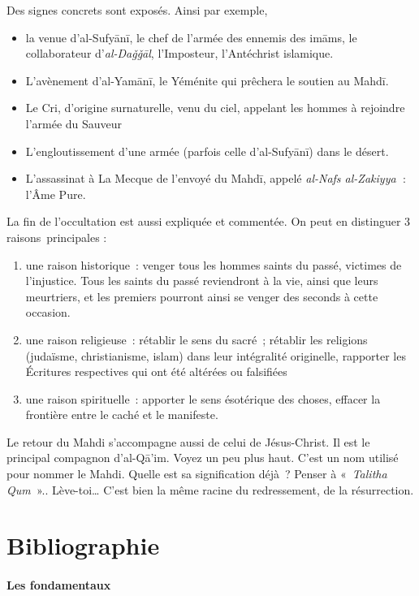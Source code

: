 Des signes concrets sont exposés. Ainsi par exemple,

\begin{itemize}
\item
  la venue d'al-Sufyānī, le chef de l'armée des ennemis des imāms, le
  collaborateur d'\emph{al-Daǧǧāl}, l'Imposteur, l'Antéchrist islamique.
\item
  L'avènement d'al-Yamānī, le Yéménite qui prêchera le soutien au Mahdī.
\item
  Le Cri, d'origine surnaturelle, venu du ciel, appelant les hommes à
  rejoindre l'armée du Sauveur
\item
  L'engloutissement d'une armée (parfois celle d'al-Sufyānī) dans le
  désert.
\item
  L'assassinat à La Mecque de l'envoyé du Mahdī, appelé \emph{al-Nafs
  al-Zakiyya\textbf{~}}: l'Âme Pure.
\end{itemize}

La fin de l'occultation est aussi expliquée et commentée. On peut en
distinguer 3 raisons~principales :
\begin{enumerate}
    \item une raison historique~: venger tous les hommes saints du passé,
victimes de l'injustice. Tous les saints du passé reviendront à la vie,
ainsi que leurs meurtriers, et les premiers pourront ainsi se venger des
seconds à cette occasion.
\item une raison religieuse~: rétablir le sens du sacré~; rétablir les
religions (judaïsme, christianisme, islam) dans leur intégralité
originelle, rapporter les Écritures respectives qui ont été altérées ou
falsifiées
\item une raison spirituelle~: apporter le sens ésotérique des choses,
effacer la frontière entre le caché et le manifeste.
\end{enumerate}
 

Le retour du Mahdi s'accompagne aussi de celui de Jésus-Christ. Il est
le principal compagnon d'al-Qā'im. Voyez un peu plus haut. C'est un nom
utilisé pour nommer le Mahdi. Quelle est sa signification déjà~? Penser
à «~\emph{Talitha Qum~}».. Lève-toi\ldots{} C'est bien la même racine du
redressement, de la résurrection.

 
\section{Bibliographie}\label{bibliographie}

\paragraph{Les fondamentaux}

